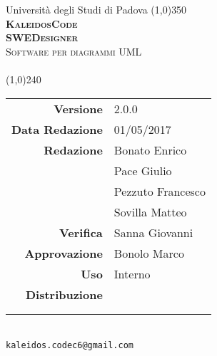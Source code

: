 \documentclass[a4paper,12pt]{article}
\author{KaleidosCode}
\date{09/03/2017}	%
\begin{document}
	\begin{titlepage}
		\centering Università degli Studi di Padova
		\line(1,0){350}\\
		\vspace{0.4cm}
		{\bfseries\scshape\LARGE KaleidosCode\\}
		\vspace{0.4cm}
		{\bfseries\scshape\LARGE SWEDesigner\\}
		{\scshape\Large Software per diagrammi UML\\}
		\vspace{1cm}
		{\scshape\Large \specificatecnicai\ \\}		%
		\vspace{1.4cm}
		\logo
		\vspace{1.2cm}
		\line(1,0){240}\\
		\begin{tabular}{r|l}
			{\hfill \textbf{Versione}} 			& 2.0.0\\
			{\hfill \textbf{Data Redazione}} 	& 01/05/2017\\	%
			{\hfill \textbf{Redazione}} 		& Bonato Enrico\\ & Pace Giulio\\ & Pezzuto Francesco\\ & Sovilla Matteo\\
			{\hfill \textbf{Verifica}} 			& Sanna Giovanni\\
			{\hfill \textbf{Approvazione}} 		& Bonolo Marco\\
			{\hfill \textbf{Uso}} 				& Interno\\
			{\hfill \textbf{Distribuzione}} 	& \vardanega \\ & \cardin \\ & \proponente\\
		\end{tabular}\\
		\vspace{2cm}
		\texttt{kaleidos.codec6@gmail.com}
	\end{titlepage}

	\pagestyle{myfront}
	\newpage
		
	\newpage
		\tableofcontents
	\newpage
		\listoftables
	\newpage
		\listoffigures
	\newpage
	\pagestyle{mymain}
		
	\newpage
		
	\newpage
		
	\newpage
		
	\newpage
		
	\appendix
	\newpage
		
	\label{LastPage}
\end{document}
